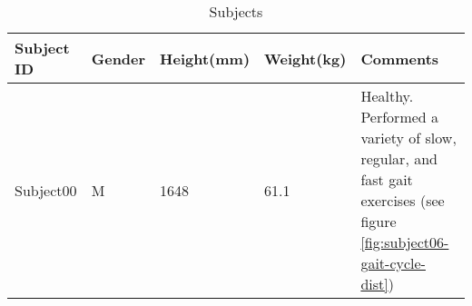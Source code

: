 \begin{table}[ht!]
    \centering
    \caption{Subjects }
    \label{tab:subject-table}
    \small
    \begin{tabular}{>{\raggedright}p{17mm} | p{10mm} p{17mm} p{17mm} | p{40mm}}
        Subject ID  & Gender    & Height(mm)   & Weight(kg)   & Comments\\ \hline
        Subject00   & M         & 1648          & 61.1          & Healthy. Performed a variety of slow, regular, and fast gait exercises (see figure \ref{fig:subject06-gait-cycle-dist})\\
    \end{tabular}
\end{table}